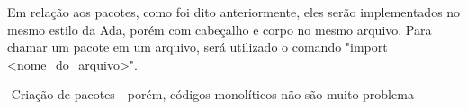 Em relação aos pacotes, como foi dito anteriormente, eles serão implementados no mesmo estilo da Ada, porém com cabeçalho e corpo no mesmo arquivo. Para chamar um pacote em um arquivo, será utilizado o comando "import <nome_do_arquivo>".

-Criação de pacotes - porém, códigos monolíticos não são muito problema